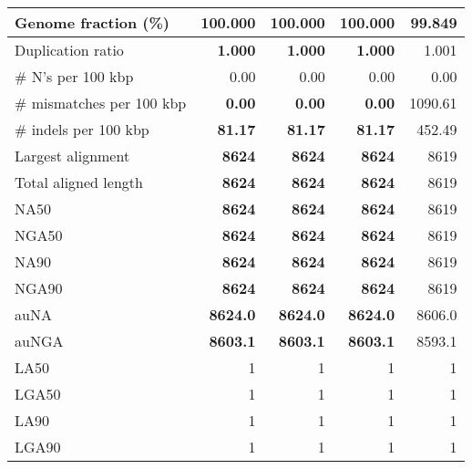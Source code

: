 \documentclass[12pt,a4paper]{article}
\begin{document}
\begin{table}[ht]
\begin{center}
\begin{tabular}{|l*{4}{|r}|}
Genome fraction (\%) & {\bf 100.000} & {\bf 100.000} & {\bf 100.000} & 99.849 \\ \hline
Duplication ratio & {\bf 1.000} & {\bf 1.000} & {\bf 1.000} & 1.001 \\ \hline
\# N's per 100 kbp & 0.00 & 0.00 & 0.00 & 0.00 \\ \hline
\# mismatches per 100 kbp & {\bf 0.00} & {\bf 0.00} & {\bf 0.00} & 1090.61 \\ \hline
\# indels per 100 kbp & {\bf 81.17} & {\bf 81.17} & {\bf 81.17} & 452.49 \\ \hline
Largest alignment & {\bf 8624} & {\bf 8624} & {\bf 8624} & 8619 \\ \hline
Total aligned length & {\bf 8624} & {\bf 8624} & {\bf 8624} & 8619 \\ \hline
NA50 & {\bf 8624} & {\bf 8624} & {\bf 8624} & 8619 \\ \hline
NGA50 & {\bf 8624} & {\bf 8624} & {\bf 8624} & 8619 \\ \hline
NA90 & {\bf 8624} & {\bf 8624} & {\bf 8624} & 8619 \\ \hline
NGA90 & {\bf 8624} & {\bf 8624} & {\bf 8624} & 8619 \\ \hline
auNA & {\bf 8624.0} & {\bf 8624.0} & {\bf 8624.0} & 8606.0 \\ \hline
auNGA & {\bf 8603.1} & {\bf 8603.1} & {\bf 8603.1} & 8593.1 \\ \hline
LA50 & 1 & 1 & 1 & 1 \\ \hline
LGA50 & 1 & 1 & 1 & 1 \\ \hline
LA90 & 1 & 1 & 1 & 1 \\ \hline
LGA90 & 1 & 1 & 1 & 1 \\ \hline
\end{tabular}
\end{center}
\end{table}
\end{document}
